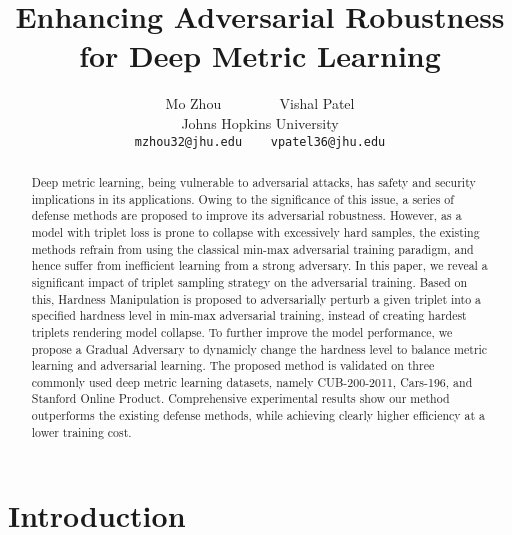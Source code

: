 \documentclass[10pt,twocolumn,letterpaper]{article}
\begin{document}
\title{Enhancing Adversarial Robustness for Deep Metric Learning}

\author{Mo Zhou ~~~~~~~ Vishal Patel\\
Johns Hopkins University\\
{\tt\small mzhou32@jhu.edu ~~ vpatel36@jhu.edu}
}
\maketitle

\begin{abstract}
	Deep metric learning, being vulnerable to adversarial
	attacks, has safety and security implications in its applications.
	Owing to the significance of this issue, a series of defense methods
	are proposed to improve its adversarial robustness.
	However, as a model with triplet loss is prone to collapse with
	excessively hard samples, the existing methods refrain from using the
	classical min-max adversarial training paradigm, and hence suffer from
	inefficient learning from a strong adversary.
	In this paper, we reveal a significant impact of triplet sampling strategy
	on the adversarial training.
	Based on this, Hardness Manipulation is proposed to adversarially perturb
	a given triplet into a specified hardness level in min-max adversarial
	training, instead of creating hardest triplets rendering model collapse.
	To further improve the model performance, we propose a Gradual
	Adversary to dynamicly change the hardness level to balance metric
	learning and adversarial learning.
	The proposed method is validated on three commonly
	used deep metric learning datasets, namely CUB-200-2011, Cars-196,
	and Stanford Online Product.
	Comprehensive experimental results show our method outperforms
	the existing defense methods, while achieving clearly higher
	efficiency at a lower training cost.
\end{abstract}

\section{Introduction}
\label{sec:1}
\end{document}
